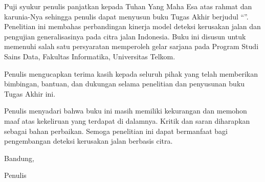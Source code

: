 
Puji syukur penulis panjatkan kepada Tuhan Yang Maha Esa atas rahmat dan karunia-Nya sehingga penulis dapat menyusun buku Tugas Akhir berjudul ``\Judul''. Penelitian ini membahas perbandingan kinerja model deteksi kerusakan jalan dan pengujian generalisasinya pada citra jalan Indonesia. Buku ini disusun untuk memenuhi salah satu persyaratan memperoleh gelar sarjana pada Program Studi Sains Data, Fakultas Informatika, Universitas Telkom.

Penulis mengucapkan terima kasih kepada seluruh pihak yang telah memberikan bimbingan, bantuan, dan dukungan selama penelitian dan penyusunan buku Tugas Akhir ini.

Penulis menyadari bahwa buku ini masih memiliki kekurangan dan memohon maaf atas kekeliruan yang terdapat di dalamnya. Kritik dan saran diharapkan sebagai bahan perbaikan. Semoga penelitian ini dapat bermanfaat bagi pengembangan deteksi kerusakan jalan berbasis citra.

\vspace{12pt}
\hfill\begin{minipage}{.45\textwidth}
\centering
Bandung, \Tahun\par
Penulis
\end{minipage}
